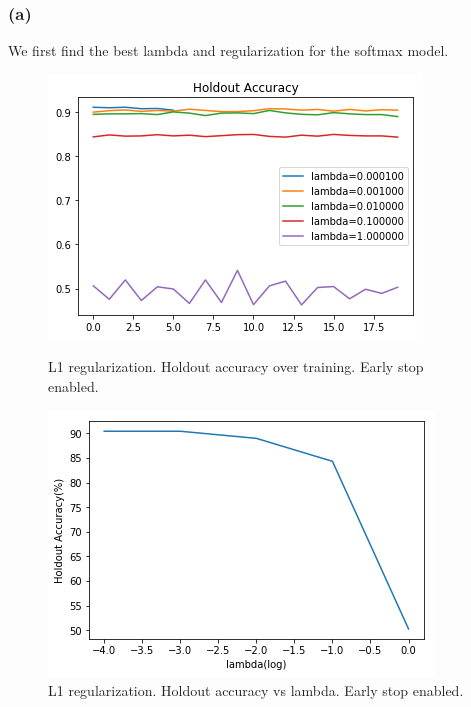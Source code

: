\documentclass{article}
\begin{document}
\subsubsection*{(a)}
We first find the best lambda and regularization for the softmax model. 
\begin{figure}[h]
	\begin{minipage}{0.48\textwidth}
		\centering
		\includegraphics[width=\textwidth]{pics/softmax_reg_1.png}
		\caption{L1 regularization. Holdout  accuracy over training. Early stop enabled.}
	\end{minipage}\hfill
	\begin {minipage}{0.48\textwidth}
	\centering
	\includegraphics[width=\textwidth]{pics/softmax_reg_2.png}
	\caption{L1 regularization. Holdout accuracy vs lambda. Early stop enabled.}
\end{minipage}
\end{figure}
\end{document}
